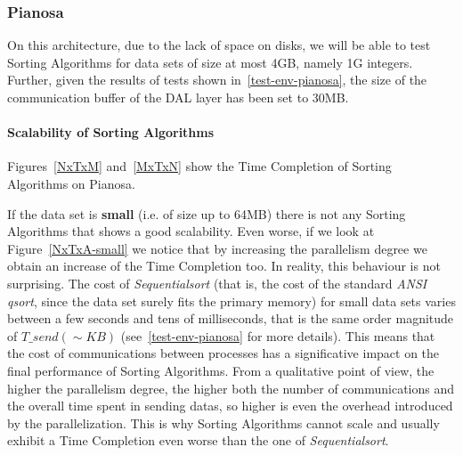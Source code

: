 \subsubsection{Pianosa}
On this architecture, due to the lack of space on disks, we will be able to test Sorting Algorithms for data sets of size at most 4GB, namely 1G integers. Further, given the results of tests shown in~\ref{test-env-pianosa}, the size of the communication buffer of the DAL layer has been set to 30MB. 

\paragraph{Scalability of Sorting Algorithms}
Figures~\ref{NxTxM} and~\ref{MxTxN} show the Time Completion of Sorting Algorithms on Pianosa.

If the data set is \textbf{small} (i.e. of size up to 64MB) there is not any Sorting Algorithms that shows a good scalability. Even worse, if we look at Figure~\ref{NxTxA-small} we notice that by increasing the parallelism degree we obtain an increase of the Time Completion too. In reality, this behaviour is not surprising. The cost of \textit{Sequentialsort} (that is, the cost of the standard \textit{ANSI qsort}, since the data set surely fits the primary memory) for small data sets varies between a few seconds and tens of milliseconds, that is the same order magnitude of $T\_send( \sim KB )$ (see~\ref{test-env-pianosa} for more details). This means that the cost of communications between processes has a significative impact on the final performance of Sorting Algorithms. From a qualitative point of view, the higher the parallelism degree, the higher both the number of communications and the overall time spent in sending datas, so higher is even the overhead introduced by the parallelization. This is why Sorting Algorithms cannot scale and usually exhibit a Time Completion even worse than the one of \textit{Sequentialsort}.

